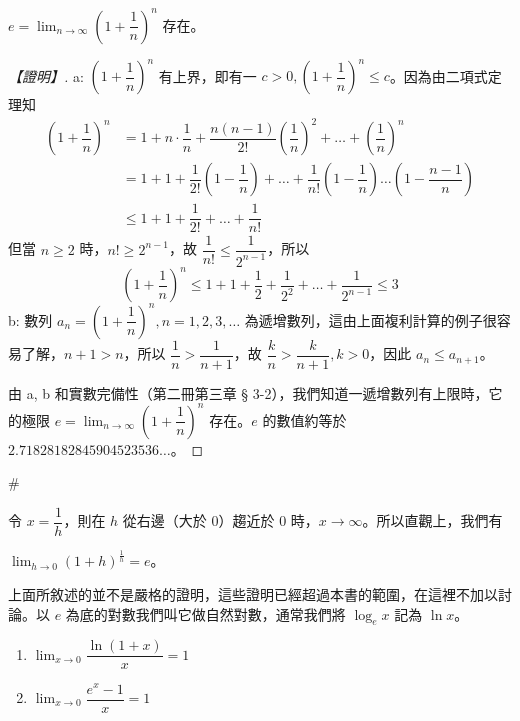 \begin{theorem}\label{thm:b6-app4-euler-e}
$e = \lim_{n\to\infty}\left(1+\dfrac{1}{n}\right)^n$ 存在。
\end{theorem}

\begin{proof}[【證明】]
a: $\left(1+\dfrac{1}{n}\right)^n$ 有上界，即有一 $c>0, \left(1+\dfrac{1}{n}\right)^n \le c$。因為由二項式定理知
\begin{align*}
\left(1+\dfrac{1}{n}\right)^n &= 1 + n\cdot\dfrac{1}{n} + \dfrac{n(n-1)}{2!}\left(\dfrac{1}{n}\right)^2 + \dots + \left(\dfrac{1}{n}\right)^n \\
&= 1 + 1 + \dfrac{1}{2!}\left(1-\dfrac{1}{n}\right) + \dots + \dfrac{1}{n!}\left(1-\dfrac{1}{n}\right)\dots\left(1-\dfrac{n-1}{n}\right) \\
&\le 1 + 1 + \dfrac{1}{2!} + \dots + \dfrac{1}{n!}
\end{align*}
但當 $n\ge 2$ 時，$n!\ge 2^{n-1}$，故 $\dfrac{1}{n!}\le\dfrac{1}{2^{n-1}}$，所以
\[ \left(1+\dfrac{1}{n}\right)^n \le 1 + 1 + \dfrac{1}{2} + \dfrac{1}{2^2} + \dots + \dfrac{1}{2^{n-1}} \le 3 \]
b: 數列 $a_n = \left(1+\dfrac{1}{n}\right)^n, n=1, 2, 3, \dots$ 為遞增數列，這由上面複利計算的例子很容易了解，$n+1>n$，所以 $\dfrac{1}{n}>\dfrac{1}{n+1}$，故 $\dfrac{k}{n}>\dfrac{k}{n+1}, k>0$，因此 $a_n \le a_{n+1}$。

由 a, b 和實數完備性（第二冊第三章 § 3-2），我們知道一遞增數列有上限時，它的極限 $e = \lim_{n\to\infty}\left(1+\dfrac{1}{n}\right)^n$ 存在。$e$ 的數值約等於 $2.71828182845904523536\dots$。
\end{proof}\hfill$\#$

令 $x=\dfrac{1}{h}$，則在 $h$ 從右邊（大於 0）趨近於 0 時，$x\longrightarrow\infty$。所以直觀上，我們有

\begin{theorem}\label{thm:b6-app4-lim-h-e}
$\lim_{h\to 0}(1+h)^{\frac{1}{h}} = e$。
\end{theorem}

上面所敘述的並不是嚴格的證明，這些證明已經超過本書的範圍，在這裡不加以討論。以 $e$ 為底的對數我們叫它做自然對數，通常我們將 $\log_e x$ 記為 $\ln x$。

\setcounter{lemma}{5}
\begin{lemma}\label{lem:b6-app4-e-limits}
\begin{enumerate}[label=(\roman*), leftmargin=2em]
  \item $\lim_{x\to 0}\dfrac{\ln(1+x)}{x} = 1$
  \item $\lim_{x\to 0}\dfrac{e^x-1}{x} = 1$
\end{enumerate}
\end{lemma}

